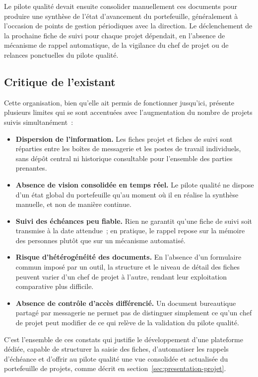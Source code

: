 Le pilote qualité devait ensuite consolider manuellement ces documents pour produire une synthèse de l'état d'avancement du portefeuille, généralement à l'occasion de points de gestion périodiques avec la direction. Le déclenchement de la prochaine fiche de suivi pour chaque projet dépendait, en l'absence de mécanisme de rappel automatique, de la vigilance du chef de projet ou de relances ponctuelles du pilote qualité.

\subsection{Critique de l'existant}
\label{subsec:critique-existant}

Cette organisation, bien qu'elle ait permis de fonctionner jusqu'ici, présente plusieurs limites qui se sont accentuées avec l'augmentation du nombre de projets suivis simultanément~:

\begin{itemize}[label=--]
    \item \textbf{Dispersion de l'information.} Les fiches projet et fiches de suivi sont réparties entre les boîtes de messagerie et les postes de travail individuels, sans dépôt central ni historique consultable pour l'ensemble des parties prenantes.
    \item \textbf{Absence de vision consolidée en temps réel.} Le pilote qualité ne dispose d'un état global du portefeuille qu'au moment où il en réalise la synthèse manuelle, et non de manière continue.
    \item \textbf{Suivi des échéances peu fiable.} Rien ne garantit qu'une fiche de suivi soit transmise à la date attendue~; en pratique, le rappel repose sur la mémoire des personnes plutôt que sur un mécanisme automatisé.
    \item \textbf{Risque d'hétérogénéité des documents.} En l'absence d'un formulaire commun imposé par un outil, la structure et le niveau de détail des fiches peuvent varier d'un chef de projet à l'autre, rendant leur exploitation comparative plus difficile.
    \item \textbf{Absence de contrôle d'accès différencié.} Un document bureautique partagé par messagerie ne permet pas de distinguer simplement ce qu'un chef de projet peut modifier de ce qui relève de la validation du pilote qualité.
\end{itemize}

C'est l'ensemble de ces constats qui justifie le développement d'une plateforme dédiée, capable de structurer la saisie des fiches, d'automatiser les rappels d'échéance et d'offrir au pilote qualité une vue consolidée et actualisée du portefeuille de projets, comme décrit en section~\ref{sec:presentation-projet}.

